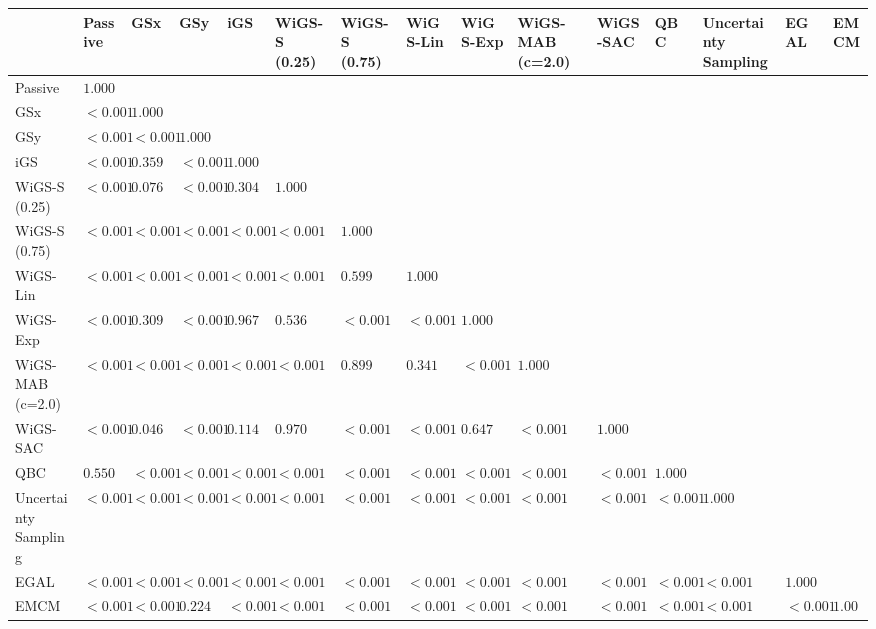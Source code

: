 \begin{tabular}{lllllllllllllll}
\toprule
 & Passive & GSx & GSy & iGS & WiGS-S (0.25) & WiGS-S (0.75) & WiGS-Lin & WiGS-Exp & WiGS-MAB (c=2.0) & WiGS-SAC & QBC & Uncertainty Sampling & EGAL & EMCM \\
\midrule
Passive & $1.000$ &  &  &  &  &  &  &  &  &  &  &  &  &  \\
GSx & $<0.001$ & $1.000$ &  &  &  &  &  &  &  &  &  &  &  &  \\
GSy & $<0.001$ & $<0.001$ & $1.000$ &  &  &  &  &  &  &  &  &  &  &  \\
iGS & $<0.001$ & $0.359$ & $<0.001$ & $1.000$ &  &  &  &  &  &  &  &  &  &  \\
WiGS-S (0.25) & $<0.001$ & $0.076$ & $<0.001$ & $0.304$ & $1.000$ &  &  &  &  &  &  &  &  &  \\
WiGS-S (0.75) & $<0.001$ & $<0.001$ & $<0.001$ & $<0.001$ & $<0.001$ & $1.000$ &  &  &  &  &  &  &  &  \\
WiGS-Lin & $<0.001$ & $<0.001$ & $<0.001$ & $<0.001$ & $<0.001$ & $0.599$ & $1.000$ &  &  &  &  &  &  &  \\
WiGS-Exp & $<0.001$ & $0.309$ & $<0.001$ & $0.967$ & $0.536$ & $<0.001$ & $<0.001$ & $1.000$ &  &  &  &  &  &  \\
WiGS-MAB (c=2.0) & $<0.001$ & $<0.001$ & $<0.001$ & $<0.001$ & $<0.001$ & $0.899$ & $0.341$ & $<0.001$ & $1.000$ &  &  &  &  &  \\
WiGS-SAC & $<0.001$ & $0.046$ & $<0.001$ & $0.114$ & $0.970$ & $<0.001$ & $<0.001$ & $0.647$ & $<0.001$ & $1.000$ &  &  &  &  \\
QBC & $0.550$ & $<0.001$ & $<0.001$ & $<0.001$ & $<0.001$ & $<0.001$ & $<0.001$ & $<0.001$ & $<0.001$ & $<0.001$ & $1.000$ &  &  &  \\
Uncertainty Sampling & $<0.001$ & $<0.001$ & $<0.001$ & $<0.001$ & $<0.001$ & $<0.001$ & $<0.001$ & $<0.001$ & $<0.001$ & $<0.001$ & $<0.001$ & $1.000$ &  &  \\
EGAL & $<0.001$ & $<0.001$ & $<0.001$ & $<0.001$ & $<0.001$ & $<0.001$ & $<0.001$ & $<0.001$ & $<0.001$ & $<0.001$ & $<0.001$ & $<0.001$ & $1.000$ &  \\
EMCM & $<0.001$ & $<0.001$ & $0.224$ & $<0.001$ & $<0.001$ & $<0.001$ & $<0.001$ & $<0.001$ & $<0.001$ & $<0.001$ & $<0.001$ & $<0.001$ & $<0.001$ & $1.000$ \\
\bottomrule
\end{tabular}

